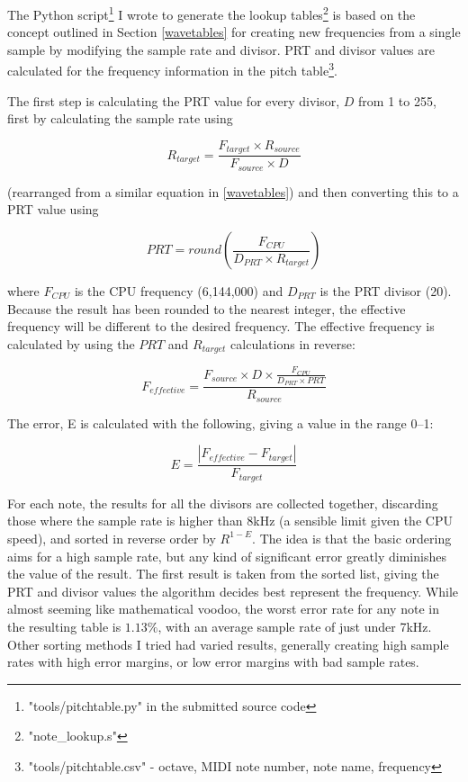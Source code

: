 The Python script\footnote{"tools/pitchtable.py" in the submitted source code} I wrote to generate 
the lookup tables\footnote{"note\_lookup.s"} is based on the concept outlined in Section 
\ref{wavetables} for creating new frequencies from a single sample by modifying the sample rate and 
divisor.  PRT and divisor values are calculated for the frequency information in the pitch 
table\footnote{"tools/pitchtable.csv" - octave, MIDI note number, note name, frequency}.

The first step is calculating the PRT value for every divisor, $D$ from 1 to 255, first by 
calculating the sample rate using

\[R_{target} = \frac{F_{target} \times R_{source}}{F_{source} \times D}\]

(rearranged from a similar equation in \ref{wavetables}) and then converting this to a PRT value 
using

\[PRT = round\left(\frac{F_{CPU}}{D_{PRT}\times{}R_{target}}\right)\]

where $F_{CPU}$ is the CPU frequency (6,144,000) and $D_{PRT}$ is the PRT divisor (20).  Because the 
result has been rounded to the nearest integer, the effective frequency will be different to the 
desired frequency.  The effective frequency is calculated by using the $PRT$ and $R_{target}$ 
calculations in reverse:

\[F_{effective} = \frac{F_{source}\times{}D\times{}\frac{F_{CPU}}{D_{PRT}\times{}PRT}}{R_{source}}\]

The error, E is calculated with the following, giving a value in the range 0--1:

\[E = \frac{\left|F_{effective} - F_{target}\right|}{F_{target}}\]

For each note, the results for all the divisors are collected together, discarding those where the 
sample rate is higher than 8kHz (a sensible limit given the CPU speed), and sorted in reverse order 
by $R^{1-E}$.  The idea is that the basic ordering aims for a high sample rate, but any kind of 
significant error greatly diminishes the value of the result.  The first result is taken from the 
sorted list, giving the PRT and divisor values the algorithm decides best represent the frequency.  
While almost seeming like mathematical voodoo, the worst error rate for any note in the resulting 
table is $1.13\%$, with an average sample rate of just under 7kHz.  Other sorting methods I tried 
had varied results, generally creating high sample rates with high error margins, or low error 
margins with bad sample rates.

